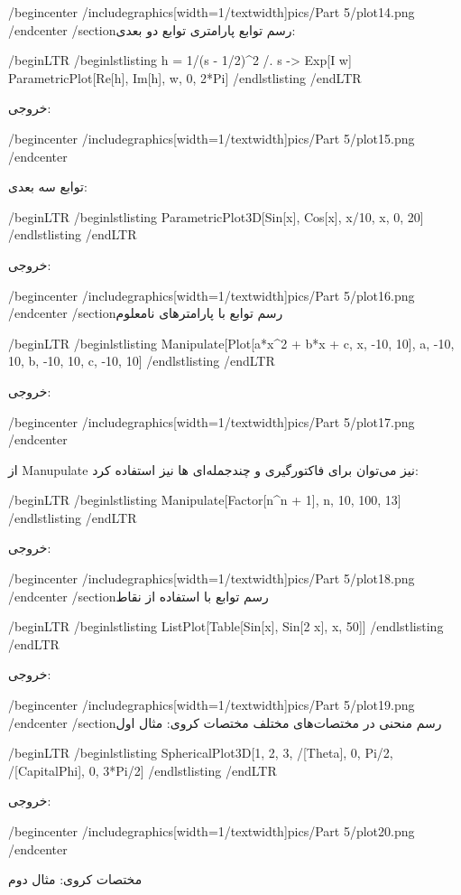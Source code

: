 /begin{center}
/includegraphics[width=1/textwidth]{pics/Part 5/plot14.png}
/end{center}
/section{رسم توابع پارامتری}
توابع دو بعدی:

/begin{LTR}
/begin{lstlisting}
h = 1/(s - 1/2)^2 /. s -> Exp[I w]
ParametricPlot[{Re[h], Im[h]}, {w, 0, 2*Pi}]
/end{lstlisting}
/end{LTR}

خروجی:

/begin{center}
/includegraphics[width=1/textwidth]{pics/Part 5/plot15.png}
/end{center}

توابع سه بعدی:

/begin{LTR}
/begin{lstlisting}
ParametricPlot3D[{Sin[x], Cos[x], x/10}, {x, 0, 20}]
/end{lstlisting}
/end{LTR}

خروجی:

/begin{center}
/includegraphics[width=1/textwidth]{pics/Part 5/plot16.png}
/end{center}
/section{رسم توابع با پارامترهای نامعلوم}

/begin{LTR}
/begin{lstlisting}
Manipulate[Plot[a*x^2 + b*x + c, {x, -10, 10}], {a, -10, 10}, {b, -10, 
  10}, {c, -10, 10}]
/end{lstlisting}
/end{LTR}

خروجی:

/begin{center}
/includegraphics[width=1/textwidth]{pics/Part 5/plot17.png}
/end{center}

از Manupulate نیز می‌توان برای فاکتورگیری و چندجمله‌ای ها نیز استفاده کرد:

/begin{LTR}
/begin{lstlisting}
Manipulate[Factor[n^n + 1], {n, 10, 100, 13}]
/end{lstlisting}
/end{LTR}

خروجی:

/begin{center}
/includegraphics[width=1/textwidth]{pics/Part 5/plot18.png}
/end{center}
/section{رسم توابع با استفاده از نقاط}

/begin{LTR}
/begin{lstlisting}
ListPlot[Table[{Sin[x], Sin[2 x]}, {x, 50}]]
/end{lstlisting}
/end{LTR}

خروجی:

/begin{center}
/includegraphics[width=1/textwidth]{pics/Part 5/plot19.png}
/end{center}
/section{رسم منحنی در مختصات‌های مختلف}
مختصات کروی: مثال اول

/begin{LTR}
/begin{lstlisting}
SphericalPlot3D[{1, 2, 3}, {/[Theta], 0, Pi/2}, {/[CapitalPhi], 0, 
  3*Pi/2}]
/end{lstlisting}
/end{LTR}

خروجی:

/begin{center}
/includegraphics[width=1/textwidth]{pics/Part 5/plot20.png}
/end{center}

مختصات کروی: مثال دوم

